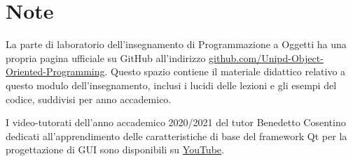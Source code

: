 \documentclass[10pt,a4paper,oneside]{article}
\begin{document}
\section{Note}
La parte di laboratorio dell'insegnamento di Programmazione a Oggetti ha una propria pagina ufficiale su GitHub all'indirizzo \href{https://github.com/Unipd-Object-Oriented-Programming}{github.com/Unipd-Object-Oriented-Programming}. Questo spazio contiene il materiale didattico relativo a questo modulo dell'insegnamento, inclusi i lucidi delle lezioni e gli esempi del codice, suddivisi per anno accademico.

I video-tutorati dell'anno accademico 2020/2021 del tutor Benedetto Cosentino dedicati all'apprendimento delle caratteristiche di base del framework Qt per la progettazione di GUI sono disponibili su \href{https://www.youtube.com/playlist?list=PLH_Fd-836q-VcqWnnzsq3GOF2-0i_Az7p}{YouTube}.
\end{document}
